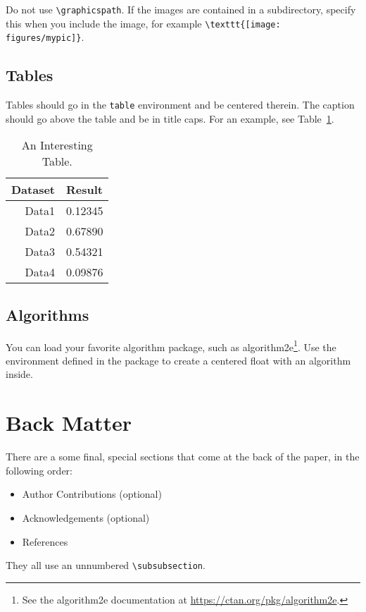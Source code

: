 \documentclass{uai2023} %
\begin{document}
Do not use \verb|\graphicspath|.
If the images are contained in a subdirectory, specify this when you include the image, for example \verb|\texttt{[image: figures/mypic]}|.

\subsection{Tables}\label{sec:tables}
Tables should go in the \texttt{table} environment and be centered therein.
The caption should go above the table and be in title caps.
For an example, see Table~\ref{tab:data}.
\begin{table}
    \centering
    \caption{An Interesting Table.}\label{tab:data}
    \begin{tabular}{rl}
      \toprule %
      \bfseries Dataset & \bfseries Result\\
      \midrule %
      Data1 & 0.12345\\
      Data2 & 0.67890\\
      Data3 & 0.54321\\
      Data4 & 0.09876\\
      \bottomrule %
    \end{tabular}
\end{table}

\subsection{Algorithms}\label{sec:algorithms}
You can load your favorite algorithm package, such as \textsf{algorithm2e}\footnote{See the \textsf{algorithm2e} documentation at \url{https://ctan.org/pkg/algorithm2e}.}.
Use the environment defined in the package to create a centered float with an algorithm inside.

\section{Back Matter}
There are a some final, special sections that come at the back of the paper, in the following order:
\begin{itemize}
  \item Author Contributions (optional)
  \item Acknowledgements (optional)
  \item References
\end{itemize}
They all use an unnumbered \verb|\subsubsection|.
\end{document}
